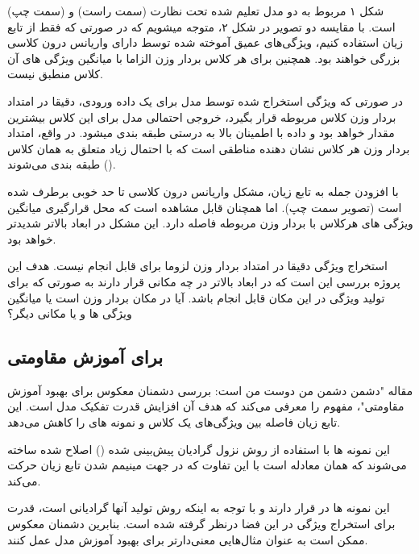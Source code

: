 \documentclass{article}
\begin{document}
شکل ۱ مربوط به دو مدل تعلیم شده تحت نظارت  (سمت راست) و  (سمت چپ) است.
با مقایسه دو تصویر در شکل ۲، متوجه میشویم که در صورتی که فقط از تابع زیان 
 استفاده کنیم، ویژگی‌های عمیق آموخته شده توسط
دارای واریانس درون کلاسی بزرگی خواهند بود.
همچنین برای هر کلاس بردار وزن الزاما با میانگین ویژگی های آن کلاس منطبق نیست.

در صورتی که ویژگی استخراج شده توسط مدل برای یک داده ورودی، دقیقا در امتداد بردار وزن کلاس مربوطه قرار بگیرد، خروجی احتمالی مدل برای این کلاس بیشترین مقدار خواهد بود و داده با اطمینان بالا به درستی طبقه بندی میشود.
در واقع، امتداد بردار وزن هر کلاس نشان دهنده مناطقی است که با احتمال زیاد متعلق به همان کلاس طبقه بندی می‌شوند ().

با افزودن جمله  به تابع زیان، مشکل واریانس درون کلاسی تا حد خوبی برطرف شده است (تصویر سمت چپ).
اما همچنان قابل مشاهده است که محل قرارگیری میانگین ویژگی های هرکلاس با بردار وزن مربوطه فاصله دارد.
این مشکل در ابعاد بالاتر شدیدتر خواهد بود.

استخراج ویژگی دقیقا در امتداد بردار وزن لزوما برای  قابل انجام نیست.
هدف این پروژه بررسی این است که 
در ابعاد بالاتر در چه مکانی قرار دارند به صورتی که برای 
تولید ویژگی در این مکان قابل انجام باشد.
آیا 
در مکان بردار وزن است یا میانگین ویژگی ها و یا مکانی دیگر؟

\subsection{ برای آموزش مقاومتی}
مقاله "دشمن دشمن من دوست من است: بررسی دشمنان معکوس برای بهبود آموزش مقاومتی"، مفهوم  را معرفی می‌کند که هدف آن افزایش قدرت تفکیک مدل است.
این تابع زیان فاصله بین ویژگی‌های یک کلاس و نمونه های  را کاهش می‌دهد.

 این نمونه ها با استفاده از روش نزول گرادیان پیش‌بینی شده () اصلاح شده ساخته می‌شوند که همان معادله 
است با این تفاوت که در جهت مینیمم شدن تابع زیان حرکت می‌کند.

این نمونه ها در 
قرار دارند و با توجه به اینکه روش تولید آنها گرادیانی است، قدرت 
برای استخراج ویژگی در این فضا درنظر گرفته شده است.
بنابرین دشمنان معکوس ممکن است به عنوان مثال‌هایی معنی‌دارتر برای بهبود آموزش مدل عمل کنند.
\end{document}
